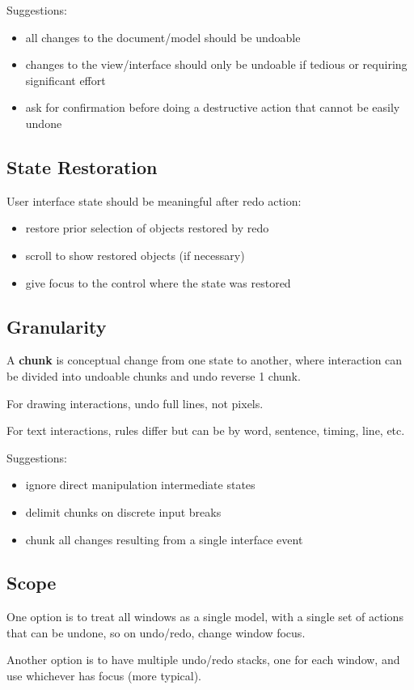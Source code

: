 \documentclass[11pt]{article}
\begin{document}
Suggestions:
\begin{itemize}
\item all changes to the document/model should be undoable
\item changes to the view/interface should only be undoable if tedious or requiring significant effort
\item ask for confirmation before doing a destructive action that cannot be easily undone
\end{itemize}
\subsection{State Restoration}
\label{sec:org06595e6}
User interface state should be meaningful after redo action:
\begin{itemize}
\item restore prior selection of objects restored by redo
\item scroll to show restored objects (if necessary)
\item give focus to the control where the state was restored
\end{itemize}
\subsection{Granularity}
\label{sec:orga5966c8}
A \textbf{chunk} is conceptual change from one state to another, where interaction can be divided into
undoable chunks and undo reverse 1 chunk.

For drawing interactions, undo full lines, not pixels.

For text interactions, rules differ but can be by word, sentence, timing, line, etc.

Suggestions:
\begin{itemize}
\item ignore direct manipulation intermediate states
\item delimit chunks on discrete input breaks
\item chunk all changes resulting from a single interface event
\end{itemize}
\subsection{Scope}
\label{sec:org8af59dc}
One option is to treat all windows as a single model, with a single set of actions that can be undone,
so on undo/redo, change window focus.

Another option is to have multiple undo/redo stacks, one for each window, and use whichever has focus
(more typical).
\end{document}
